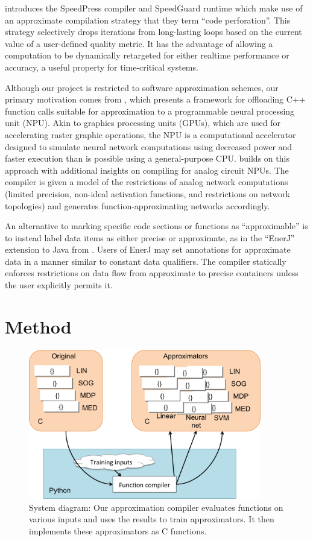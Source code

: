 \documentclass{article}
\begin{document}
\cite{Agarwal09} introduces the SpeedPress compiler and SpeedGuard runtime which make use of an approximate compilation strategy that they term ``code perforation''. This strategy selectively drops iterations from long-lasting loops based on the current value of a user-defined quality metric. It has the advantage of allowing a computation to be dynamically retargeted for either realtime performance or accuracy, a useful property for time-critical systems.

Although our project is restricted to software approximation schemes, our primary motivation comes from \cite{Esmaeilzadeh12}, which presents a framework for offloading C++ function calls suitable for approximation to a programmable neural processing unit (NPU). Akin to graphics processing units (GPUs), which are used for accelerating raster graphic operations, the NPU is a computational accelerator designed to simulate neural network computations using decreased power and faster execution than is possible using a general-purpose CPU. \cite{Amant14} builds on this approach with additional insights on compiling for analog circuit NPUs. The compiler is given a model of the restrictions of analog network computations (limited precision, non-ideal activation functions, and restrictions on network topologies) and generates function-approximating networks accordingly.

An alternative to marking specific code sections or functions as ``approximable'' is to instead label data items as either precise or approximate, as in the ``EnerJ'' extension to Java from \cite{Sampson11}. Users of EnerJ may set annotations for approximate data in a manner similar to constant data qualifiers. The compiler statically enforces restrictions on data flow from approximate to precise containers unless the user explicitly permits it.

\section{Method}

\begin{figure}
  \centering
  \includegraphics[width=4in]{images/diagram.png}
  \caption{System diagram: Our approximation compiler evaluates functions on various inputs and uses the results to train approximators. It then implements these approximators as C functions.}
\end{figure}
\end{document}
